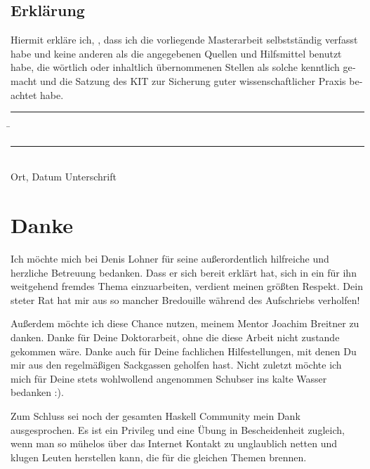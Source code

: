 \documentclass[12pt,a4paper,twoside,headings=openright]{scrreprt}
\begin{document}
\tableofcontents









\printbibliography

\begin{otherlanguage}{ngerman}
\chapter*{Erklärung}
\pagestyle{empty}

  \vspace{20mm}
  Hiermit erkläre ich, \theauthor, dass ich die vorliegende Masterarbeit selbst\-ständig
verfasst habe und keine anderen als die angegebenen Quellen und Hilfsmittel
benutzt habe, die wörtlich oder inhaltlich übernommenen Stellen als solche kenntlich gemacht und
die Satzung des KIT zur Sicherung guter wissenschaftlicher Praxis beachtet habe.
  \vspace{20mm}
  \begin{tabbing}
  \rule{4cm}{.4pt}\hspace{1cm} \= \rule{7cm}{.4pt} \\
 Ort, Datum \> Unterschrift
  \end{tabbing}
\end{otherlanguage}

\chapter*{Danke}
\pagestyle{empty}

Ich möchte mich bei Denis Lohner für seine außerordentlich hilfreiche und herzliche Betreuung bedanken.
Dass er sich bereit erklärt hat, sich in ein für ihn weitgehend fremdes Thema einzuarbeiten, verdient meinen größten Respekt.
Dein steter Rat hat mir aus so mancher Bredouille während des Aufschriebs verholfen!

Außerdem möchte ich diese Chance nutzen, meinem Mentor Joachim Breitner zu danken.
Danke für Deine Doktorarbeit, ohne die diese Arbeit nicht zustande gekommen wäre.
Danke auch für Deine fachlichen Hilfestellungen, mit denen Du mir aus den regelmäßigen Sackgassen geholfen hast.
Nicht zuletzt möchte ich mich für Deine stets wohlwollend angenommen Schubser ins kalte Wasser bedanken :).

Zum Schluss sei noch der gesamten Haskell Community mein Dank ausgesprochen.
Es ist ein Privileg und eine Übung in Bescheidenheit zugleich, wenn man so mühelos über das Internet Kontakt zu unglaublich netten und klugen Leuten herstellen kann, die für die gleichen Themen brennen.

\pagestyle{fancy}
\appendix

%
\end{document}
